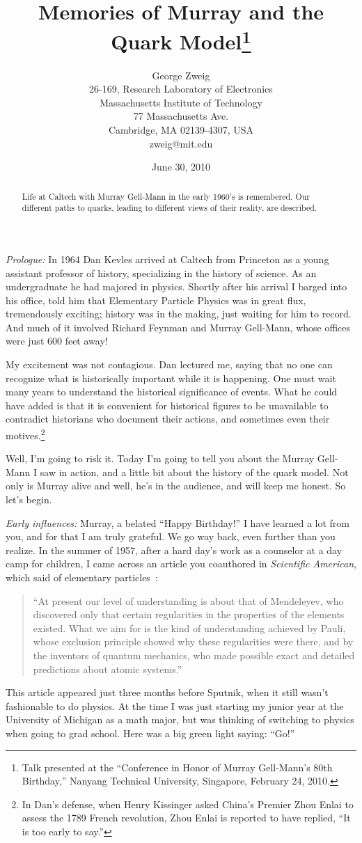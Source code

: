 \documentclass[12pt]{article}
\title{Memories of Murray and the Quark Model\footnote{
Talk presented at the ``Conference in Honor of Murray Gell-Mann's 80th Birthday,'' Nanyang Technical University, Singapore, February 24, 2010.} }
\author{George Zweig\\
26-169, Research Laboratory of Electronics\\
Massachusetts Institute of Technology \\
77 Massachusetts Ave.\\
Cambridge, MA 02139-4307, USA\\
zweig@mit.edu
}
\date{June 30, 2010}
\begin{document}
\maketitle
\begin{abstract}
\noindent Life at Caltech with Murray Gell-Mann in the early 1960's is remembered. Our different paths to quarks, leading to different views of their reality, are described. 
\end{abstract}


{\it Prologue:} In 1964 Dan Kevles arrived at Caltech from Princeton as a young assistant professor of history, specializing in the history of science. As an undergraduate he had majored in physics. Shortly after his arrival I barged  into his office, told him that Elementary Particle Physics was in great flux, tremendously exciting; history was in the making, just waiting for him to record. And much of it involved Richard Feynman and Murray Gell-Mann, whose offices were just 600 feet away!

My excitement was not contagious. Dan lectured me, saying that no one can recognize what is historically important while it is happening. One must wait many years to understand the historical significance of events. What he could have added is that it is convenient for historical figures to be unavailable to contradict historians who document their actions, and sometimes even their motives.\footnote{In Dan's defense, when Henry Kissinger asked China's Premier Zhou Enlai to assess the 1789 French revolution, Zhou Enlai is reported to have replied, ``It is too early to say.''}

Well, I'm going to risk it. Today I'm going to tell you  about the Murray Gell-Mann I saw in action, and a little bit about the history of the quark model. Not only is Murray alive and well, he's in the audience, and will keep me honest. So let's begin.

{\it Early influences:} Murray, a belated ``Happy Birthday!''  I have learned a lot from you, and for that I am truly grateful. We go way back, even further than you realize. In the summer of 1957, after a hard day's work as a counselor at a day camp for children, I came across an article you coauthored in {\it Scientific American}, which said of elementary particles~\cite{MGMsciAm1}:

\begin{quote}
``At present our level of understanding is about that of Mendeleyev, who discovered only that certain regularities in the properties of the elements existed. What we aim for is the kind of understanding achieved by Pauli, whose exclusion principle showed why these regularities were there, and by the inventors of quantum mechanics, who made possible exact and detailed predictions about atomic systems.''
\end{quote}
This article appeared just three months before  Sputnik, when it still wasn't fashionable to do physics.
At the time I was just starting my junior year at the University of Michigan as a math major, but was thinking of switching to physics when going to grad school. Here was a big green light saying: ``Go!''
\end{document}
